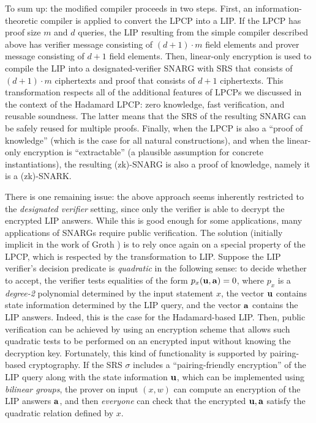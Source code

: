 To sum up: the modified compiler proceeds in two steps.
First, an information-theoretic compiler is applied to convert the LPCP into a LIP.
If the LPCP has proof size $m$ and $d$ queries, the LIP resulting from the simple compiler described above has verifier message consisting of $(d+1)\cdot m$ field elements and prover message consisting of $d+1$ field elements.
Then, linear-only encryption is used to compile the LIP into a designated-verifier SNARG with SRS that consists of $(d+1)\cdot m$ ciphertexts and proof that consists of $d+1$ ciphertexts.
This transformation respects all of the additional features of LPCPs we discussed in the context of the Hadamard LPCP: zero knowledge, fast verification, and reusable soundness.
The latter means that the SRS of the resulting SNARG can be safely reused for multiple proofs.
Finally, when the LPCP is also a ``proof of knowledge'' (which is the case for all natural constructions), and when the linear-only encryption is ``extractable'' (a plausible assumption for concrete instantiations), the resulting (zk)-SNARG is also a proof of knowledge, namely it is a (zk)-SNARK.


There is one remaining issue: the above approach seems inherently restricted to the {\em designated verifier} setting, since only the verifier is able to decrypt the encrypted LIP answers.
While this is good enough for some applications, many applications of SNARGs require public verification.
The solution (initially implicit in the work of Groth \cite{2010:Gro:short-pairing-based-NIZKA}) is to rely once again on a special property of the LPCP, which is respected by the transformation to LIP.
Suppose the LIP verifier's decision predicate is {\em quadratic} in the following sense: 
to decide whether to accept, the verifier tests equalities of the form $p_x({\bf u}, {\bf a})=0$, where $p_x$ is a {\em degree-2} polynomial determined by the input statement $x$, the vector ${\bf u}$ contains state information determined by the LIP query, and the vector ${\bf a}$ contains the LIP answers.
Indeed, this is the case for the Hadamard-based LIP.
Then, public verification can be achieved by using an encryption scheme that allows such quadratic tests to be performed on an encrypted input without knowing the decryption key.
Fortunately, this kind of functionality is supported by pairing-based cryptography.
If the SRS $\sigma$ includes a ``pairing-friendly encryption'' of the LIP query along with the state information ${\bf u}$, which can be implemented using {\em bilinear groups}, the prover on input $(x,w)$ can compute an encryption of the LIP answers $\bf a$, and then {\em everyone} can check that the encrypted $\bf u,a$ satisfy the quadratic relation defined by $x$. 

